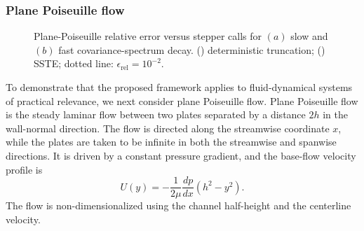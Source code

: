 \subsubsection{Plane Poiseuille flow}
\label{sec:appendix_verification_poiseuille}
\begin{figure}[t]
    \centering
    \begin{minipage}[t]{0.48\textwidth}
        \centering
        \vspace{0pt}
        
    \end{minipage}
    \hfill
    \begin{minipage}[t]{0.48\textwidth}
        \centering
        \vspace{0pt}
        
    \end{minipage}
    \caption{Plane-Poiseuille relative error versus stepper calls for \((a)\) slow and \((b)\) fast covariance-spectrum decay. (\solidlegend) deterministic truncation; (\dashlegend\circlegend) SSTE; dotted line: \(\epsilon_{\mathrm{rel}}=10^{-2}\).}
    \label{fig:Poiseuille_eig_vs_sste}
\end{figure}
To demonstrate that the proposed framework applies to fluid-dynamical systems of practical relevance, we next consider plane Poiseuille flow. Plane Poiseuille flow is the steady laminar flow between two plates separated by a distance \(2h\) in the wall-normal direction. The flow is directed along the streamwise coordinate \(x\), while the plates are taken to be infinite in both the streamwise and spanwise directions. It is driven by a constant pressure gradient, and the base-flow velocity profile is
\begin{equation}
  U(y) = -\frac{1}{2\mu}\frac{dp}{dx}\left(h^2-y^2\right).
\end{equation}
The flow is non-dimensionalized using the channel half-height and the centerline velocity.

